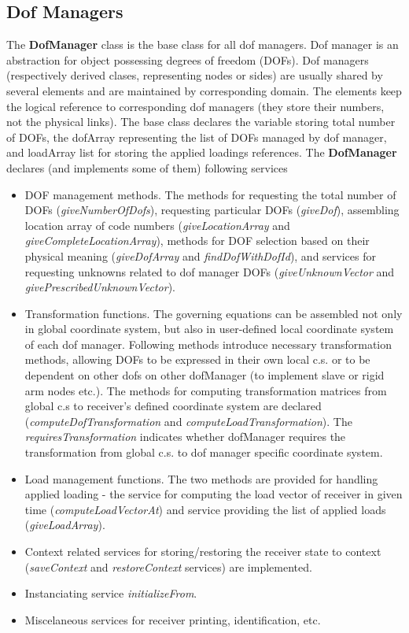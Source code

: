 \documentclass[12pt,draft]{article}
\newcommand{\class}[1]{{\bf #1}}
\newcommand{\service}[1]{{\em #1}}
\newcommand{\attribute}[1]{#1}
\begin{document}
\subsection{Dof Managers}
The \class{DofManager} class is the base class for all dof
managers. Dof manager is an abstraction for object possessing degrees
of freedom (DOFs). Dof managers (respectively derived clases,
representing nodes or sides) are usually shared by several elements
and are maintained by corresponding domain. The elements keep the
logical reference to corresponding dof managers (they store their
numbers, not the physical links). 
The base class declares the variable storing total number of DOFs, 
the \attribute{dofArray} representing the list of DOFs managed by dof
manager, and \attribute{loadArray} list for storing the applied
loadings references.
The \class{DofManager} declares (and implements some of them)
following services
\begin{itemize}
\item
DOF management methods. The methods for requesting the total number of
DOFs (\service{giveNumberOfDofs}), requesting particular DOFs
(\service{giveDof}), assembling location array of code numbers
(\service{giveLocationArray} and \service{giveCompleteLocationArray}),
methods for DOF selection based on their physical meaning
(\service{giveDofArray} and \service{findDofWithDofId}), and services
for requesting unknowns related to dof manager DOFs
(\service{giveUnknownVector} and \service{givePrescribedUnknownVector}).
\item
Transformation functions. 
The governing equations can be assembled not only in global coordinate system, but
also in user-defined local coordinate system of each dof
manager. Following methods introduce necessary transformation methods, 
allowing DOFs to be expressed in their own local c.s. or to be
dependent on other dofs on other dofManager (to implement 
slave or rigid arm nodes etc.). 
The methods for computing transformation matrices from global c.s to
receiver's defined coordinate system are declared
(\service{computeDofTransformation} and
\service{computeLoadTransformation}).
The \service{requiresTransformation} indicates whether dofManager requires the transformation from global c.s. to 
dof manager specific coordinate system.	
\item
Load management functions. The two methods are provided for handling
applied loading - the service for computing the load vector of
receiver in given time (\service{computeLoadVectorAt}) and service
providing the list of applied loads (\service{giveLoadArray}).
\item
Context related services for storing/restoring the receiver state to
context (\service{saveContext} and \service{restoreContext} services)
are implemented.
\item
Instanciating service \service{initializeFrom}.
\item
Miscelaneous services for receiver printing, identification, etc.
\end{itemize}
\end{document}
